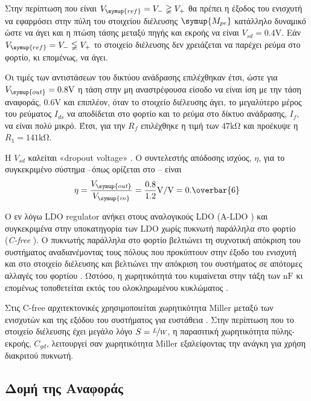 Στην περίπτωση που είναι $V_{\symup{ref}}=V_{-}\gneqq V_{+}$ θα πρέπει η έξοδος του ενισχυτή να εφαρμόσει στην πύλη του στοιχείου διέλευσης $\symup{M_{pe}}$ κατάλληλο δυναμικό ώστε να άγει και η πτώση τάσης μεταξύ πηγής και εκροής να είναι $V_{sd}=0.4\unit{\volt}$. Εάν $V_{\symup{ref}}=V_{-}\lneqq V_{+}$ το στοιχείο διέλευσης δεν χρειάζεται να παρέχει ρεύμα στο φορτίο, κι επομένως, να άγει.\par
Οι τιμές των αντιστάσεων του δικτύου ανάδρασης επιλέχθηκαν έτσι, ώστε για $V_{\symup{out}}=0.8\unit{\volt}$ η τάση στην μη αναστρέφουσα είσοδο να είναι ίση με την τάση αναφοράς, $0.6\unit{\volt}$ και επιπλέον, όταν το στοιχείο διέλευσης άγει, το μεγαλύτερο μέρος του ρεύματος $I_{ds}$ να αποδίδεται στο φορτίο και το ρεύμα στο δίκτυο ανάδρασης, $I_f$, να είναι πολύ μικρό. Έτσι, για την $R_f$ επιλέχθηκε η τιμή των $47\unit{\kilo\ohm}$ και προέκυψε η $R_1=141\unit{\kilo\ohm}$.\par
Η $V_{sd}$ καλείται «dropout voltage» \cite{ChenPower}. Ο συντελεστής απόδοσης ισχύος, $\eta$, για το συγκεκριμένο σύστημα --όπως ορίζεται στο \cite{ChenPower}-- είναι $$\eta=\frac{V_{\symup{out}}}{V_{\symup{in}}}=\frac{0.8}{1.2}\unit{\volt\per{\volt}}=0.\overbar{6}$$

Ο εν λόγω LDO regulator ανήκει στους αναλογικούς LDO (A-LDO \cite{ChenPower}) και συγκεκριμένα στην υποκατηγορία των LDO χωρίς πυκνωτή παράλληλα στο φορτίο (\textsl{C-free} \cite{ChenPower}). Ο πυκνωτής παράλληλα στο φορτίο βελτιώνει τη συχνοτική απόκριση του συστήματος αναδιανέμοντας τους πόλους που προκύπτουν στην έξοδο του ενισχυτή και στο στοιχείο διέλευσης \cite{ChenPower} και βελτιώνει την απόκριση του συστήματος σε απότομες αλλαγές του φορτίου \cite{ChenPower}. Ωστόσο, η χωρητικότητά του κυμαίνεται στην τάξη των $\unit{\nano\farad}$ \cite{ChenPower} κι επομένως τοποθετείται εκτός του ολοκληρωμένου κυκλώματος \cite{ChenPower}.\par
Στις C-free αρχιτεκτονικές χρησιμοποιείται χωρητικότητα Miller μεταξύ των ενισχυτών και της εξόδου του συστήματος για ευστάθεια \cite{ChenPower}. Στην περίπτωση που το στοιχείο διέλευσης έχει μεγάλο λόγο $S=\nicefrac{L}{W}$, η παρασιτική χωρητικότητα πύλης-εκροής, $C_{gd}$, λειτουργεί σαν χωρητικότητα Miller \cite{ChenPower} εξαλείφοντας την ανάγκη για χρήση διακριτού πυκνωτή.\par

\subsection{Δομή της Αναφοράς}

